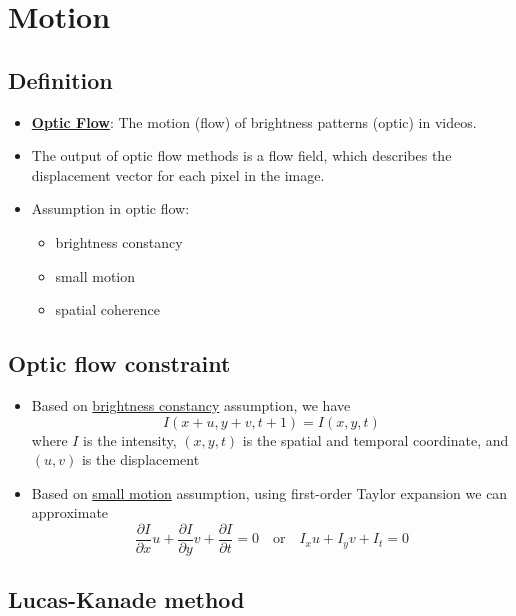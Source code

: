 \documentclass[twocolumn,landscape,10pt]{article}
\theoremstyle{definition}
\begin{document}
\section{Motion}

\subsection{Definition}

\begin{itemize}
    \item \underline{\textbf{Optic Flow}}: The motion (flow) of brightness
        patterns (optic) in videos. 
    \item The output of optic flow methods is a flow
        field, which describes the displacement vector for each pixel in the
        image.
    \item Assumption in optic flow:
        \begin{itemize}
            \item brightness constancy
            \item small motion
            \item spatial coherence
        \end{itemize} 
\end{itemize} 

\subsection{Optic flow constraint}

\begin{itemize}
    \item Based on \underline{brightness constancy} assumption, we have
        \[
            I(x+u,y+v,t+1)=I(x,y,t)
        \]
        where $I$ is the intensity, $(x,y,t)$ is the spatial and temporal
        coordinate, and $(u,v)$ is the displacement
    \item Based on \underline{small motion} assumption, using first-order Taylor
        expansion we can approximate
        \[
            \frac{\partial I}{\partial x}u+\frac{\partial I}{\partial y}v
            +\frac{\partial I}{\partial t}=0
            \quad\text{or}\quad
            I_xu+I_yv+I_t=0
        \]
\end{itemize} 

\subsection{Lucas-Kanade method}
\end{document}
